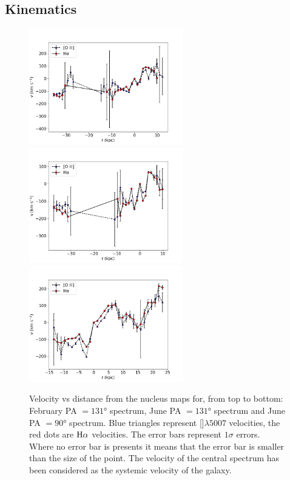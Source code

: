 \documentclass[../main.tex]{subfiles}
\begin{document}
\subsection{Kinematics}
\label{sec:pap3_kinematics}

\begin{figure}
\centering
\includegraphics[width=0.6\textwidth]{images/paper3/PA131_2016_velocity.jpg}\\ 
\includegraphics[width=0.6\textwidth]{images/paper3/PA131_velocity.jpg}\\ 
\includegraphics[width=0.6\textwidth]{images/paper3/PA90_velocity.jpg}\\ 
\caption[]{Velocity vs distance from the nucleus maps for, from top to bottom: February PA $=\ang{131}$ spectrum, June PA $=\ang{131}$ spectrum and June PA $=\ang{90}$ spectrum. Blue triangles represent []$\lambda5007$ velocities, the red dots are $\rm H\alpha$ velocities.
The error bars represent $1\sigma$ errors. Where no error bar is presents it means that the error bar is smaller than the size of the point. The velocity of the central spectrum has been considered as the systemic velocity of the galaxy.} 
\label{fig:velocity_lines}
\end{figure} 
\end{document}
